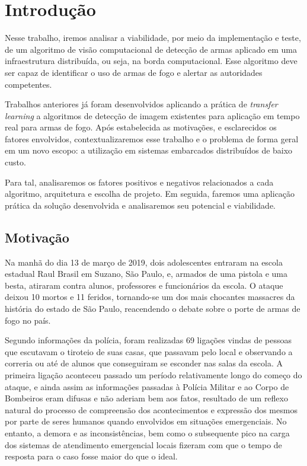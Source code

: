 \documentclass[]{politex}
\begin{document}

\chapter{Introdução}

Nesse trabalho, iremos analisar a viabilidade, por meio da implementação e teste, de um algoritmo de visão computacional de detecção de armas aplicado em uma infraestrutura distribuída, ou seja, na borda computacional. Esse algoritmo deve ser capaz de identificar o uso de armas de fogo e alertar as autoridades competentes.

Trabalhos anteriores\cite{olmos1} já foram desenvolvidos aplicando a prática de \textit{transfer learning} a algoritmos de detecção de imagem existentes para aplicação em tempo real para armas de fogo. Após estabelecida as motivações, e esclarecidos os fatores envolvidos, contextualizaremos esse trabalho e o problema de forma geral em um novo escopo: a utilização em sistemas embarcados distribuídos de baixo custo.

Para tal, analisaremos os fatores positivos e negativos relacionados a cada algoritmo, arquitetura e escolha de projeto. Em seguida, faremos uma aplicação prática da solução desenvolvida e analisaremos seu potencial e viabilidade.

\section{Motivação}

Na manhã do dia 13 de março de 2019, dois adolescentes entraram na escola estadual Raul Brasil em Suzano, São Paulo, e, armados de uma pistola e uma besta, atiraram contra alunos, professores e funcionários da escola. O ataque deixou 10 mortos e 11 feridos, tornando-se um dos mais chocantes massacres da história do estado de São Paulo, reacendendo o debate sobre o porte de armas de fogo no país.

Segundo informações da polícia\cite{noticiapolicia}, foram realizadas 69 ligações vindas de pessoas que escutavam o tiroteio de suas casas, que passavam pelo local e observando a correria ou até de alunos que conseguiram se esconder nas salas da escola. A primeira ligação aconteceu passado um período relativamente longo do começo do ataque, e ainda assim as informações passadas à Polícia Militar e ao Corpo de Bombeiros eram difusas e não aderiam bem aos fatos, resultado de um reflexo natural do processo de compreensão dos acontecimentos e expressão dos mesmos por parte de seres humanos quando envolvidos em situações emergenciais. No entanto, a demora e as inconsistências, bem como o subsequente pico na carga dos sistemas de atendimento emergencial locais fizeram com que o tempo de resposta para o caso fosse maior do que o ideal.
\end{document}
